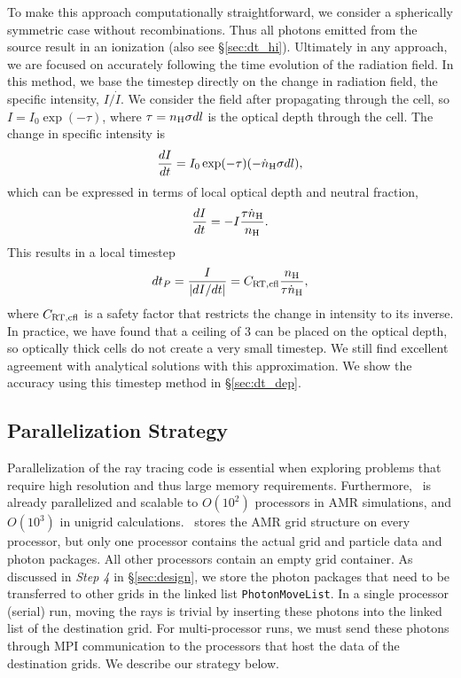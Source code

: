 \documentclass[useAMS,usenatbib]{mn2e}
\begin{document}
To make this approach computationally straightforward, we consider a
spherically symmetric case without recombinations.  Thus all photons
emitted from the source result in an ionization (also see
\S\ref{sec:dt_hi}).  Ultimately in any approach, we are focused on
accurately following the time evolution of the radiation field.  In
this method, we base the timestep directly on the change in radiation
field, the specific intensity, $I/\dot{I}$.  We consider the field
after propagating through the cell, so $I = I_0 \exp(-\tau)$, where
$\tau = n_{\rm H} \sigma dl$ is the optical depth through the cell.
The change in specific intensity is
%
\begin{equation}
  \label{eqn:vifront2}
    \frac{dI}{dt} = I_0 \exp(-\tau) (-\dot{n}_{\rm H} \sigma dl),
\end{equation}
%
which can be expressed in terms of local optical depth and neutral
fraction,
\begin{equation}
  \label{eqn:vifront3}
    \frac{dI}{dt} = -I \frac{\tau \dot{n}_{\rm H}}{n_{\rm H}}.
\end{equation}
%
This results in a local timestep
%
\begin{equation}
  \label{eqn:vifront4}
  dt_P = \frac{I}{|dI/dt|} = C_{\rm RT,cfl} \frac{n_{\rm H}}{\tau \dot{n}_{\rm H}},
\end{equation}
%
where $C_{\rm RT,cfl}$ is a safety factor that restricts the change in
intensity to its inverse.  In practice, we have found that a ceiling
of 3 can be placed on the optical depth, so optically thick cells do
not create a very small timestep.  We still find excellent agreement
with analytical solutions with this approximation.  We show the
accuracy using this timestep method in \S\ref{sec:dt_dep}.

\subsection{Parallelization Strategy}
\label{sec:parallel}

Parallelization of the ray tracing code is essential when exploring
problems that require high resolution and thus large memory
requirements.  Furthermore, \enzo~is already parallelized and scalable
to $O(10^2)$ processors in AMR simulations, and $O(10^3)$ in unigrid
calculations.  \enzo~stores the AMR grid structure on every processor,
but only one processor contains the actual grid and particle data and
photon packages.  All other processors contain an empty grid
container.  As discussed in \textit{Step 4} in \S\ref{sec:design}, we
store the photon packages that need to be transferred to other grids
in the linked list \texttt{PhotonMoveList}.  In a single processor
(serial) run, moving the rays is trivial by inserting these photons
into the linked list of the destination grid.  For multi-processor
runs, we must send these photons through MPI communication to the
processors that host the data of the destination grids.  We describe
our strategy below.
\end{document}
